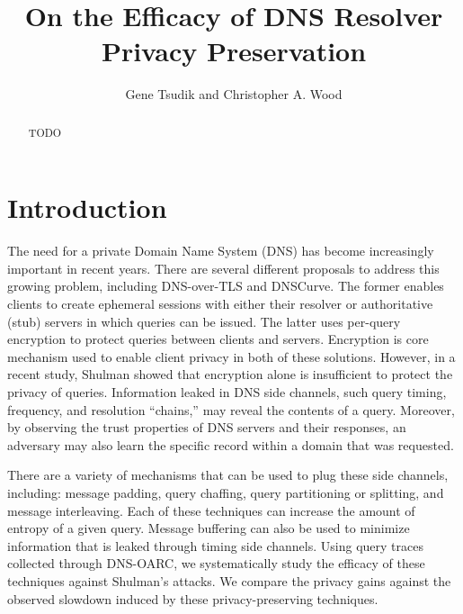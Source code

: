\documentclass{llncs}
\begin{document}
\mainmatter              %
\title{On the Efficacy of DNS Resolver Privacy Preservation}

\author{Gene Tsudik and Christopher A. Wood}


\maketitle

\begin{abstract}
TODO
\end{abstract}


\section{Introduction}
The need for a private Domain Name System (DNS) has become increasingly important
in recent years. There are several different proposals to address this
growing problem, including DNS-over-TLS and DNSCurve.
The former enables clients to create ephemeral sessions with either
their resolver or authoritative (stub) servers in which queries can be issued.
The latter uses per-query encryption to protect queries between clients and servers.
Encryption is core mechanism used to enable client privacy in both of these
solutions. However, in a recent study, Shulman showed that encryption alone
is insufficient to protect the privacy of queries. Information leaked
in DNS side channels, such query timing, frequency, and resolution ``chains,''
may reveal the contents of a query. Moreover, by observing the
trust properties of DNS servers and their responses, an adversary may also
learn the specific record within a domain that was requested.

There are a variety of mechanisms that can be used to plug these side channels, including:
message padding, query chaffing, query partitioning or splitting, and message interleaving.
Each of these techniques can increase the amount of entropy of a given query. Message buffering
can also be used to minimize information that is leaked through timing side channels.
Using query traces collected through DNS-OARC, we systematically study the efficacy of these
techniques against Shulman's attacks. We compare the privacy gains against the observed slowdown
induced by these privacy-preserving techniques.
\end{document}
